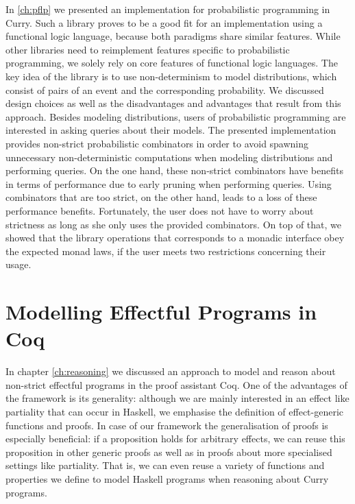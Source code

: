 In \autoref{ch:pflp} we presented an implementation for probabilistic programming in Curry.
Such a library proves to be a good fit for an implementation using a functional logic language, because both paradigms share similar features.
While other libraries need to reimplement features specific to probabilistic programming, we solely rely on core features of functional logic languages.
The key idea of the library is to use non\--determinism to model distributions, which consist of pairs of an event and the corresponding probability.
We discussed design choices as well as the disadvantages and advantages that result from this approach.
Besides modeling distributions, users of probabilistic programming are interested in asking queries about their models.
The presented implementation provides non\--strict probabilistic combinators in order to avoid spawning unnecessary non\--deterministic computations when modeling distributions and performing queries.
On the one hand, these non\--strict combinators have benefits in terms of performance due to early pruning when performing queries.
Using combinators that are too strict, on the other hand, leads to a loss of these performance benefits.
Fortunately, the user does not have to worry about strictness as long as she only uses the provided combinators.
On top of that, we showed that the library operations that corresponds to a monadic interface obey the expected monad laws, if the user meets two restrictions concerning their usage.

\section{Modelling Effectful Programs in Coq}

In chapter \autoref{ch:reasoning} we discussed an approach to model and reason about non\--strict effectful programs in the proof assistant Coq.
One of the advantages of the framework is its generality: although we are mainly interested in an effect like partiality that can occur in Haskell, we emphasise the definition of effect\--generic functions and proofs.
In case of our framework the generalisation of proofs is especially beneficial: if a proposition holds for arbitrary effects, we can reuse this proposition in other generic proofs as well as in proofs about more specialised settings like partiality.
That is, we can even reuse a variety of functions and properties we define to model Haskell programs when reasoning about Curry programs.

